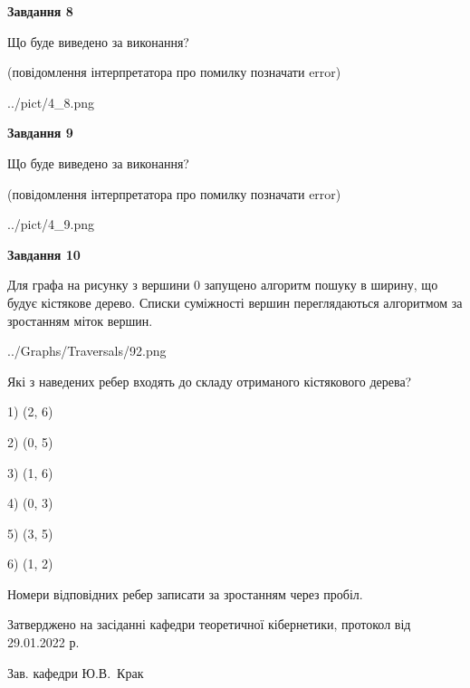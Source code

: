 \documentclass[12pt, ukrainian]{article}
\begin{document}
{\begin {large}
{\begin {center}\textbf{Завдання 8}\end {center}}\par
Що буде виведено за виконання?\par
 (повідомлення інтерпретатора про помилку позначати error)
\begin{center}
	{../pict/4_8.png}
\end{center}
\newpage

{\begin {center}\textbf{Завдання 9}\end {center}}\par
Що буде виведено за виконання?\par
 (повідомлення інтерпретатора про помилку позначати error)\par
\begin{center}
	{../pict/4_9.png}
\end{center}
\newpage

{\begin {center}\textbf{Завдання 10}\end {center}}\par
Для графа на рисунку з вершини 0 запущено алгоритм пошуку в ширину, що будує кістякове дерево. Списки суміжності вершин переглядаються алгоритмом за зростанням міток вершин.\par
\begin{center}
	{../Graphs/Traversals/92.png}
\end{center}
\par Які з наведених ребер входять до складу отриманого кістякового дерева?\par
1) (2, 6)\par
2) (0, 5)\par
3) (1, 6)\par
4) (0, 3)\par
5) (3, 5)\par
6) (1, 2)\par
{\vskip 15pt} Номери відповідних ребер записати за зростанням через пробіл.\par
\newpage


\end {large}
}
{\smallskip \begin {small} Затверджено на засіданні кафедри теоретичної кібернетики, протокол  від   29.01.2022 р.\par\smallskip\smallskip
{\parbox {6.5 cm}{Зав. кафедри \dotfill Ю.В.~Крак}} \end{small}}
\end{document}
